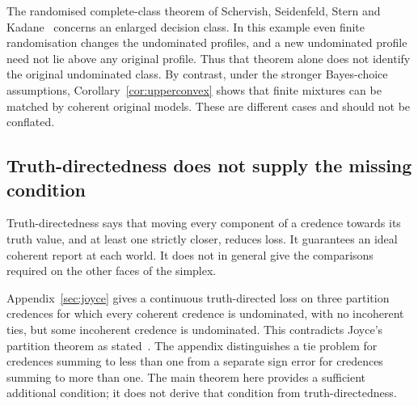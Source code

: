 \documentclass[11pt]{article}
\theoremstyle{definition}
\theoremstyle{remark}
\begin{document}
The randomised complete-class theorem of Schervish, Seidenfeld, Stern and Kadane~\cite[Theorem~1]{SSSK} concerns an enlarged decision class. In this example even finite randomisation changes the undominated profiles, and a new undominated profile need not lie above any original profile. Thus that theorem alone does not identify the original undominated class. By contrast, under the stronger Bayes-choice assumptions, Corollary~\ref{cor:upperconvex} shows that finite mixtures can be matched by coherent original models. These are different cases and should not be conflated.

\subsection{Truth-directedness does not supply the missing condition}
Truth-directedness says that moving every component of a credence towards its truth value, and at least one strictly closer, reduces loss. It guarantees an ideal coherent report at each world. It does not in general give the comparisons required on the other faces of the simplex.

Appendix~\ref{sec:joyce} gives a continuous truth-directed loss on three partition credences for which every coherent credence is undominated, with no incoherent ties, but some incoherent credence is undominated. This contradicts Joyce's partition theorem as stated~\cite[Theorem~2]{Joyce}. The appendix distinguishes a tie problem for credences summing to less than one from a separate sign error for credences summing to more than one. The main theorem here provides a sufficient additional condition; it does not derive that condition from truth-directedness.

\appendix
\end{document}
